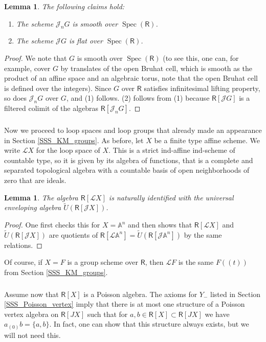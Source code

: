 \documentclass{amsart}
\newtheorem{Lem}[Thm]{Lemma}
\theoremstyle{definition}
\newcommand{\sss}{\subsubsection{}}
\newcommand{\Ring}{\mathsf{R}}
\newcommand{\Jet}{\mathscr{J}}
\newcommand{\Loop}{\mathscr{L}}
\numberwithin{equation}{section}
\begin{document}
\begin{Lem}\label{Lem:jet_smoothness_flatness}
The following claims hold:
\begin{enumerate}
\item The scheme $\Jet_n G$ is smooth over $\operatorname{Spec}(\Ring)$.
\item The scheme $\Jet G$ is flat over $\operatorname{Spec}(\Ring)$.
\end{enumerate}
\end{Lem}
\begin{proof} 
We note that $G$ is smooth over $\operatorname{Spec}(\Ring)$ (to see this, one can, for example, cover $G$ by translates of the open Bruhat cell, which is smooth as the product of an affine space and an algebraic torus, note that the open Bruhat cell is defined over the integers).
Since $G$ over $\Ring$ satisfies infinitesimal lifting property, so does $\Jet_n G$ over $G$, and (1) follows. (2) follows from (1) because $\Ring[\Jet G]$ is a filtered colimit of the algebras $\Ring[\Jet_n G]$.      
\end{proof}

\sss
Now we proceed to loop spaces and loop groups that already made an appearance in Section \ref{SSS_KM_groups}. 
As before, let $X$ be a finite type affine scheme. We write $\Loop X$ for the loop space of $X$. This is a strict ind-affine ind-scheme of countable type, so it is given by its algebra of functions, that is a complete and separated topological algebra with a countable basis of open neighborhoods of zero that are ideals. 

\begin{Lem}\label{Lem:loop_vs_univ_envel}
The algebra $\Ring[\Loop X]$ is naturally identified with the universal enveloping algebra $\widetilde{U}(\Ring[\Jet X])$. 
\end{Lem}
\begin{proof}
One first checks this for $X=\mathbb{A}^n$ and then shows that $\Ring[\Loop X]$ and  $\widetilde{U}(\Ring[\Jet X])$ are quotients of 
$\Ring[\Loop \mathbb{A}^n]=\widetilde{U}(\Ring[\Jet \mathbb{A}^n])$ by the same relations. 
\end{proof}

Of course, if $X=F$ is a group scheme over $\Ring$, then $\Loop F$ is the same $F(\!(t)\!)$ from Section \ref{SSS_KM_groups}. 

\sss\label{SSS_Poisson_structure_uniqueness}
Assume now that $\Ring[X]$ is a Poisson algebra. The axioms for $Y_-$ listed in Section \ref{SSS_Poisson_vertex} imply that there is at most one structure of a Poisson vertex algebra on $\Ring[J X]$ such that
for $a,b\in \Ring[X]\subset \Ring[JX]$ we have $a_{(0)}b=\{a,b\}$. In fact, one can show that this structure always exists, but we will not need this. 
\end{document}
